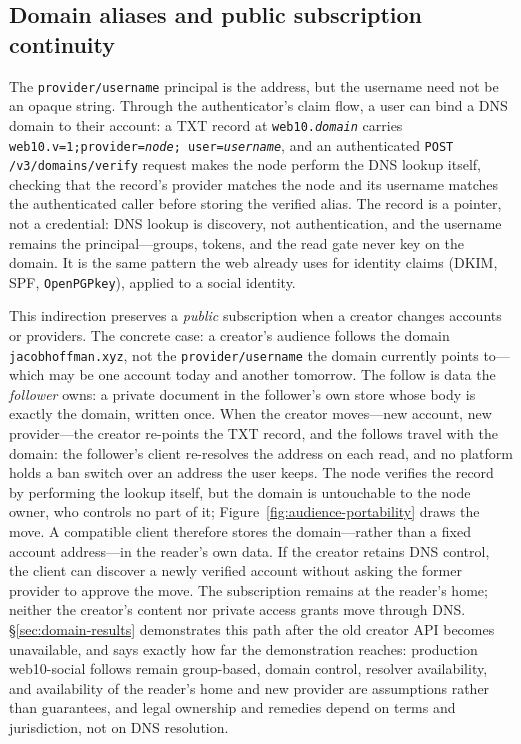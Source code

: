\documentclass[sigconf, nonacm]{acmart}
\begin{document}
\subsection{Domain aliases and public subscription continuity}

The \texttt{provider/username} principal is the address, but the username
need not be an opaque string. Through the authenticator's claim flow, a user
can bind a DNS domain to their account: a TXT record at
\texttt{web10.\emph{domain}} carries
\texttt{web10.v=1;\allowbreak provider=\emph{node};\allowbreak
user=\emph{username}}, and an authenticated \texttt{POST
/v3/domains/verify} request makes the node perform the DNS lookup itself,
checking that the record's provider matches the node and its username
matches the authenticated caller before storing the verified alias. The
record is a pointer, not a credential: DNS lookup is discovery, not
authentication, and the username remains the principal---groups, tokens, and
the read gate never key on the domain. It is the same pattern the web already
uses for identity claims (DKIM, SPF, \texttt{OpenPGPkey}), applied to a
social identity.

This indirection preserves a \emph{public} subscription when a creator
changes accounts or providers. The concrete case: a creator's audience
follows the domain \texttt{jacobhoffman.xyz}, not the
\texttt{provider/username} the domain currently points to---which may be one
account today and another tomorrow. The follow is data the \emph{follower}
owns: a private document in the follower's own store whose body is exactly
the domain, written once. When the creator moves---new account, new
provider---the creator re-points the TXT record, and the follows travel with
the domain: the follower's client re-resolves the address on each read, and
no platform holds a ban switch over an address the user keeps. The node
verifies the record by performing the lookup itself, but the domain is
untouchable to the node owner, who controls no part of it; Figure~\ref{fig:audience-portability}
draws the move. A compatible client therefore stores the domain---rather
than a fixed account address---in the reader's own data. If the creator
retains DNS control, the client can discover a newly verified account without
asking the former provider to approve the move. The subscription remains at
the reader's home; neither the creator's content nor private access grants
move through DNS. \S\ref{sec:domain-results} demonstrates this path after the
old creator API becomes unavailable, and says exactly how far the
demonstration reaches: production web10-social follows remain group-based,
domain control, resolver availability, and availability of the reader's home
and new provider are assumptions rather than guarantees, and legal ownership
and remedies depend on terms and jurisdiction, not on DNS resolution.
\end{document}
